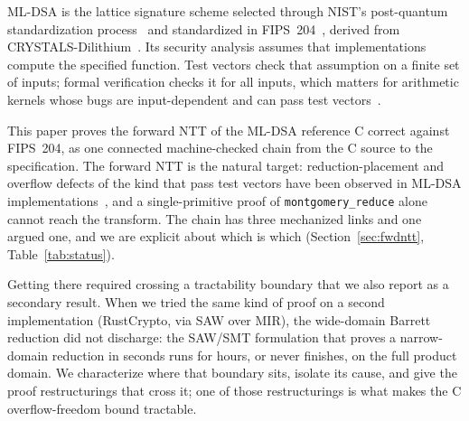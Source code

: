 \documentclass[11pt]{article}
\newcommand{\code}[1]{\texttt{#1}}
\begin{document}
ML-DSA is the lattice signature scheme selected through NIST's post-quantum standardization
process~\cite{nistpqc} and standardized in FIPS~204~\cite{fips204}, derived from
CRYSTALS-Dilithium~\cite{dilithium}. Its security analysis assumes that implementations compute the
specified function. Test vectors check that assumption on a finite set of inputs; formal verification
checks it for all inputs, which matters for arithmetic kernels whose bugs are input-dependent and can
pass test vectors~\cite{eprint1032}.

This paper proves the forward NTT of the ML-DSA reference C correct against FIPS~204, as one connected
machine-checked chain from the C source to the specification. The forward NTT is the natural target:
reduction-placement and overflow defects of the kind that pass test vectors have been observed in ML-DSA
implementations~\cite{eprint1032}, and a single-primitive proof of \code{montgomery\_reduce} alone cannot
reach the transform. The chain has three
mechanized links and one argued one, and we are explicit about which is which (Section~\ref{sec:fwdntt},
Table~\ref{tab:status}).

Getting there required crossing a tractability boundary that we also report as a secondary result. When
we tried the same kind of proof on a second implementation (RustCrypto, via SAW over MIR), the
wide-domain Barrett reduction did not discharge: the SAW/SMT formulation that proves a narrow-domain
reduction in seconds runs for hours, or never finishes, on the full product domain. We characterize
where that boundary sits, isolate its cause, and give the proof restructurings that cross it; one of
those restructurings is what makes the C overflow-freedom bound tractable.
\end{document}

